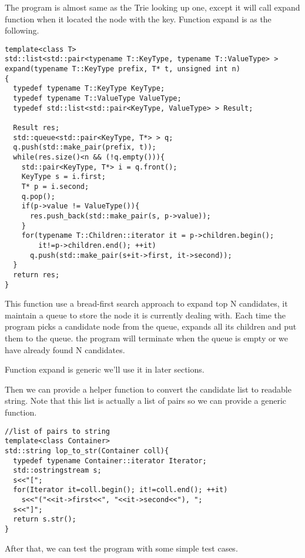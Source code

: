\documentclass{article}
\begin{document}
The program is almost same as the Trie looking up one, except it will
call expand function when it located the node with the key. Function
expand is as the following.

\begin{lstlisting}
template<class T>
std::list<std::pair<typename T::KeyType, typename T::ValueType> >
expand(typename T::KeyType prefix, T* t, unsigned int n)
{
  typedef typename T::KeyType KeyType;
  typedef typename T::ValueType ValueType;
  typedef std::list<std::pair<KeyType, ValueType> > Result;

  Result res;
  std::queue<std::pair<KeyType, T*> > q;
  q.push(std::make_pair(prefix, t));
  while(res.size()<n && (!q.empty())){
    std::pair<KeyType, T*> i = q.front();
    KeyType s = i.first;
    T* p = i.second;
    q.pop();
    if(p->value != ValueType()){
      res.push_back(std::make_pair(s, p->value));
    }
    for(typename T::Children::iterator it = p->children.begin();
        it!=p->children.end(); ++it)
      q.push(std::make_pair(s+it->first, it->second));
  }
  return res;
}
\end{lstlisting}

This function use a bread-first search approach to expand top N
candidates, it maintain a queue to store the node it is currently
dealing with. Each time the program picks a candidate node from the
queue, expands all its children and put them to the queue. the program
will terminate when the queue is empty or we have already found N
candidates.

Function expand is generic we'll use it in later sections.

Then we can provide a helper function to convert the candidate
list to readable string. Note that this list is actually a list of pairs so we can
provide a generic function.

\begin{lstlisting}
//list of pairs to string
template<class Container>
std::string lop_to_str(Container coll){
  typedef typename Container::iterator Iterator;
  std::ostringstream s;
  s<<"[";
  for(Iterator it=coll.begin(); it!=coll.end(); ++it)
    s<<"("<<it->first<<", "<<it->second<<"), ";
  s<<"]";
  return s.str();
}
\end{lstlisting}

After that, we can test the program with some simple test cases.
\end{document}
